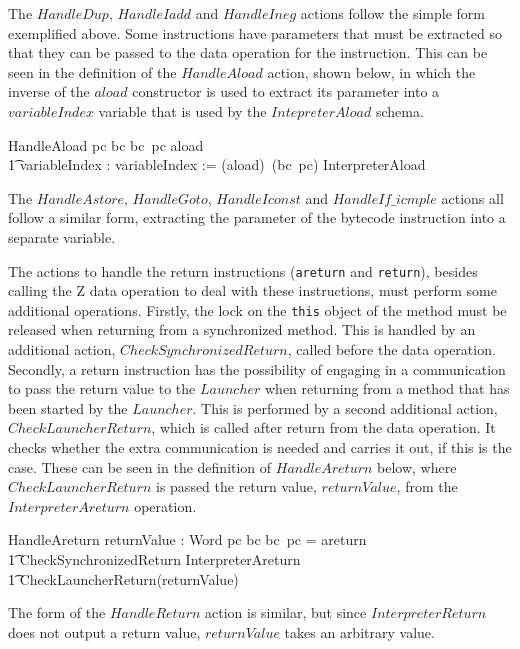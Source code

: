 The $HandleDup$, $HandleIadd$ and $HandleIneg$ actions follow the
simple form exemplified above.
Some instructions have parameters that must be extracted so that they
can be passed to the data operation for the instruction.
This can be seen in the definition of the $HandleAload$ action, shown
below, in which the inverse of the $aload$ constructor is used to
extract its parameter into a $variableIndex$ variable that is used by
the $IntepreterAload$ schema.
\begin{circusaction}
  HandleAload \circdef  \lcircguard pc \in\dom bc \land bc~pc \in \ran aload \rcircguard \circguard \\
  \t1 \circvar variableIndex : \nat \circspot variableIndex := (aload\inv)~(bc~pc) \circseq \lschexpract InterpreterAload \rschexpract
\end{circusaction}
The $HandleAstore$, $HandleGoto$, $HandleIconst$ and
$HandleIf\_icmple$ actions all follow a similar form, extracting the
parameter of the bytecode instruction into a separate variable.

The actions to handle the return instructions (\texttt{areturn} and
\texttt{return}), besides calling the Z data operation to deal with
these instructions, must perform some additional operations.
Firstly, the lock on the \texttt{this} object of the method must be
released when returning from a synchronized method.
This is handled by an additional action, $CheckSynchronizedReturn$,
called before the data operation.
Secondly, a return instruction has the possibility of engaging in a
communication to pass the return value to the $Launcher$ when
returning from a method that has been started by the $Launcher$.
This is performed by a second additional action,
$CheckLauncherReturn$, which is called after return from the data
operation.
It checks whether the extra communication is needed and carries it
out, if this is the case.
These can be seen in the definition of $HandleAreturn$ below, where
$CheckLauncherReturn$ is passed the return value, $returnValue$, from
the $InterpreterAreturn$ operation.
\begin{circusaction}
  HandleAreturn \circdef \circvar returnValue : Word \circspot \lcircguard pc \in \dom bc \land bc~pc = areturn \rcircguard \circguard \\
  \t1 CheckSynchronizedReturn \circseq \lschexpract InterpreterAreturn \rschexpract \circseq \\
  \t1 CheckLauncherReturn(returnValue)
\end{circusaction}
The form of the $HandleReturn$ action is similar, but since
$InterpreterReturn$ does not output a return value, $returnValue$
takes an arbitrary value.

